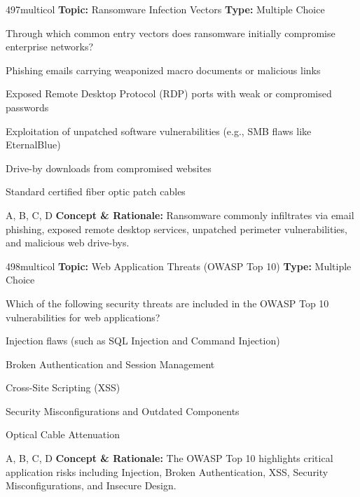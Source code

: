 \begin{qcard}{497}{multicol}
\textcolor{darkslate!75}{\small\textbf{Topic:} Ransomware Infection Vectors \hfill \textbf{Type:} Multiple Choice}\vspace{0.4em}\par
Through which common entry vectors does ransomware initially compromise enterprise networks?
\begin{qoptions}
\item Phishing emails carrying weaponized macro documents or malicious links
\item Exposed Remote Desktop Protocol (RDP) ports with weak or compromised passwords
\item Exploitation of unpatched software vulnerabilities (e.g., SMB flaws like EternalBlue)
\item Drive-by downloads from compromised websites
\item Standard certified fiber optic patch cables
\end{qoptions}
\end{qcard}
\nopagebreak
\begin{explainbox}{A, B, C, D}
\textbf{Concept \& Rationale:} Ransomware commonly infiltrates via email phishing, exposed remote desktop services, unpatched perimeter vulnerabilities, and malicious web drive-bys.
\end{explainbox}

\begin{qcard}{498}{multicol}
\textcolor{darkslate!75}{\small\textbf{Topic:} Web Application Threats (OWASP Top 10) \hfill \textbf{Type:} Multiple Choice}\vspace{0.4em}\par
Which of the following security threats are included in the OWASP Top 10 vulnerabilities for web applications?
\begin{qoptions}
\item Injection flaws (such as SQL Injection and Command Injection)
\item Broken Authentication and Session Management
\item Cross-Site Scripting (XSS)
\item Security Misconfigurations and Outdated Components
\item Optical Cable Attenuation
\end{qoptions}
\end{qcard}
\nopagebreak
\begin{explainbox}{A, B, C, D}
\textbf{Concept \& Rationale:} The OWASP Top 10 highlights critical application risks including Injection, Broken Authentication, XSS, Security Misconfigurations, and Insecure Design.
\end{explainbox}

